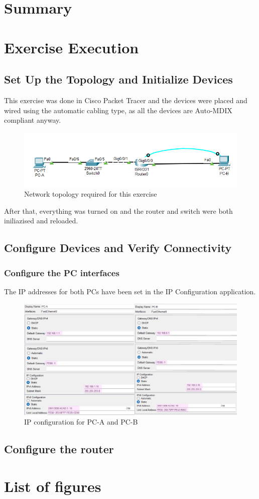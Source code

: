 \documentclass[a4paper]{article}
\newcommand{\abc}{\hfill \break}
\begin{document}
\section{Summary}


\newpage

\section{Exercise Execution}
\subsection{Set Up the Topology and Initialize Devices}
This exercise was done in Cisco Packet Tracer and the devices were placed and wired using the automatic cabling type, as all the devices are Auto-MDIX compliant anyway.\abc
\begin{figure}[h]
	\includegraphics[scale=0.45]{images/nwtopology.png}
	\centering
	\caption{Network topology required for this exercise}
\end{figure}
After that, everything was turned on and the router and switch were both iniliazised and reloaded.

\subsection{Configure Devices and Verify Connectivity}
\subsubsection{Configure the PC interfaces}
The IP addresses for both PCs have been set in the IP Configuration application.
\begin{figure}[h]
	\includegraphics[scale=0.45]{images/pc-ipconf.png}
	\centering
	\caption{IP configuration for PC-A and PC-B}
\end{figure}
\subsection{Configure the router}


\newpage
\section{List of figures}

\listoffigures
\end{document}
